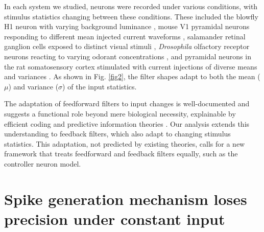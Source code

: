 \documentclass[9pt,twocolumn,twoside]{pnas-new}
\begin{document}
In each system we studied, neurons were recorded under various conditions, with stimulus statistics changing between these conditions. These included the blowfly H1 neuron with varying background luminance \citep{lewen2001neural}, mouse V1 pyramidal neurons responding to different mean injected current waveforms \citep{teeter2018generalized}, salamander retinal ganglion cells exposed to distinct visual stimuli \citep{palmer2015predictive}, {\it Drosophila} olfactory receptor neurons reacting to varying odorant concentrations \citep{gorur2017olfactory}, and pyramidal neurons in the rat somatosensory cortex stimulated with current injections of diverse means and variances \citep{rauch_lacamera_fusi2003noise}. As shown in Fig. \ref{fig2}, the filter shapes adapt to both the mean ($\mu$) and variance ($\sigma$) of the input statistics.

The adaptation of feedforward filters to input changes is well-documented \citep{srinivasan1982predictive,van1992theoretical,mainen1995reliability} and suggests a functional role beyond mere biological necessity, explainable by efficient coding and predictive information theories \citep{atick1992could,simoncelli2001natural,chalk2018toward}. Our analysis extends this understanding to feedback filters, which also adapt to changing stimulus statistics. This adaptation, not predicted by existing theories, calls for a new framework that treats feedforward and feedback filters equally, such as the controller neuron model.

\section*{Spike generation mechanism loses precision under constant input}
\end{document}
